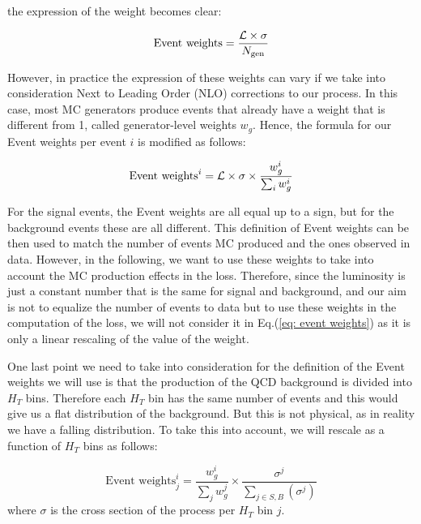 \noindent the expression of the weight becomes clear:

\begin{equation*}
    \text{Event weights} = \frac{{\mathcal{L}} \times \sigma}{N_{\text{gen}}}
\end{equation*}

However, in practice the expression of these weights can vary if we take into consideration Next to Leading Order (NLO) corrections to our process. In this case, most MC generators produce events that already have a weight that is different from 1, called generator-level weights $w_g$.
Hence, the formula for our Event weights per event $i$ is modified as follows:

\begin{equation*}
    \text{Event weights}^i = {\mathcal{L}} \times \sigma \times \frac{w_g^i}{\sum_i w_g^i}
\end{equation*}

For the signal events, the Event weights are all equal up to a sign, but for the background events these are all different.
This definition of Event weights can be then used to match the number of events MC produced and the ones observed in data. However, in the following, we want to use these weights to take into account the MC production effects in the loss. Therefore, since the luminosity is just a constant number that is the same for signal and background, and our aim is not to equalize the number of events to data but to use these weights in the computation of the loss, we will not consider it in Eq.(\ref{eq: event weights}) as it is only a linear rescaling of the value of the weight.

One last point we need to take into consideration for the definition of the Event weights we will use is that the production of the QCD background is divided into $H_T$ bins. Therefore each $H_T$ bin has the same number of events and this would give us a flat distribution of the background. But this is not physical, as in reality we have a falling distribution. To take this into account, we will rescale as a function of $H_T$ bins as follows:

\begin{equation}
	\text{Event weights}^i_j =\frac{w_g^i}{\sum_j w_g^j} \times \frac{\sigma^j}{\sum_{j\in S,B}(\sigma^j)}
 \label{eq: event weights}
\end{equation}
\noindent where $\sigma$ is the cross section of the process per $H_T$ bin $j$. 

